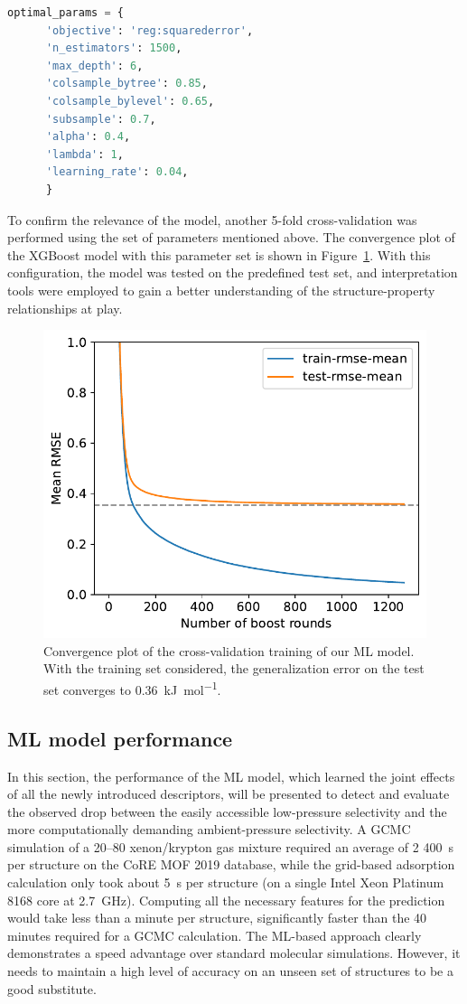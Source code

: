 \documentclass[main]{subfiles}
\begin{document}
\begin{lstlisting}[language=Python]
  optimal_params = {
      'objective': 'reg:squarederror',
      'n_estimators': 1500,
      'max_depth': 6,
      'colsample_bytree': 0.85,
      'colsample_bylevel': 0.65,
      'subsample': 0.7,
      'alpha': 0.4,
      'lambda': 1,
      'learning_rate': 0.04,
      }
  \end{lstlisting}

To confirm the relevance of the model, another 5-fold cross-validation was performed using the set of parameters mentioned above. The convergence plot of the XGBoost model with this parameter set is shown in Figure~\ref{fgr:convplot}. With this configuration, the model was tested on the predefined test set, and interpretation tools were employed to gain a better understanding of the structure-property relationships at play.

\begin{figure}[ht]
  \centering
    \includegraphics[width=0.60\linewidth]{figures/4-ml/SI_figure/convergence_plot.pdf}
    \caption{Convergence plot of the cross-validation training of our ML model. With the training set considered, the generalization error on the test set converges to 0.36~\si{\kilo\joule\per\mole}.}\label{fgr:convplot}
  \end{figure}

\subsection{ML model performance}

In this section, the performance of the ML model, which learned the joint effects of all the newly introduced descriptors, will be presented to detect and evaluate the observed drop between the easily accessible low-pressure selectivity and the more computationally demanding ambient-pressure selectivity. A GCMC simulation of a 20–80 xenon/krypton gas mixture required an average of 2 400~\si{\second} per structure on the CoRE MOF 2019 database, while the grid-based adsorption calculation only took about \SI{5}{\second} per structure (on a single Intel Xeon Platinum 8168 core at \SI{2.7}{\giga\hertz}). Computing all the necessary features for the prediction would take less than a minute per structure, significantly faster than the 40 minutes required for a GCMC calculation. The ML-based approach clearly demonstrates a speed advantage over standard molecular simulations. However, it needs to maintain a high level of accuracy on an unseen set of structures to be a good substitute.
\end{document}
